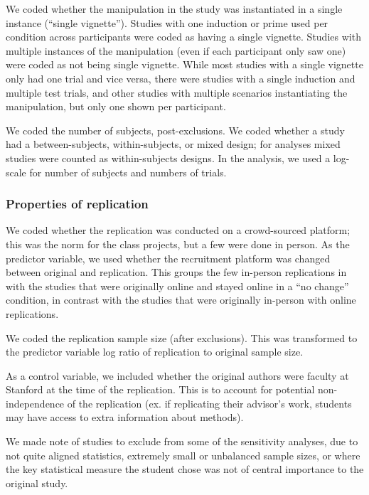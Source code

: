 \documentclass[
  english,
  a4paper,
]{article}
\begin{document}
We coded whether the manipulation in the study was instantiated in a single instance (``single vignette''). Studies with one induction or prime used per condition across participants were coded as having a single vignette. Studies with multiple instances of the manipulation (even if each participant only saw one) were coded as not being single vignette. While most studies with a single vignette only had one trial and vice versa, there were studies with a single induction and multiple test trials, and other studies with multiple scenarios instantiating the manipulation, but only one shown per participant.

We coded the number of subjects, post-exclusions. We coded whether a study had a between-subjects, within-subjects, or mixed design; for analyses mixed studies were counted as within-subjects designs. In the analysis, we used a log-scale for number of subjects and numbers of trials.

\hypertarget{properties-of-replication}{%
\subsubsection{Properties of replication}\label{properties-of-replication}}

We coded whether the replication was conducted on a crowd-sourced platform; this was the norm for the class projects, but a few were done in person. As the predictor variable, we used whether the recruitment platform was changed between original and replication. This groups the few in-person replications in with the studies that were originally online and stayed online in a ``no change'' condition, in contrast with the studies that were originally in-person with online replications.

We coded the replication sample size (after exclusions). This was transformed to the predictor variable log ratio of replication to original sample size.

As a control variable, we included whether the original authors were faculty at Stanford at the time of the replication. This is to account for potential non-independence of the replication (ex. if replicating their advisor's work, students may have access to extra information about methods).

We made note of studies to exclude from some of the sensitivity analyses, due to not quite aligned statistics, extremely small or unbalanced sample sizes, or where the key statistical measure the student chose was not of central importance to the original study.
\end{document}

